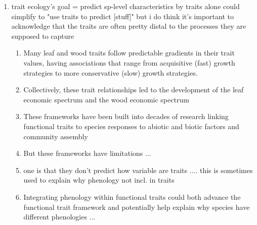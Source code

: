 \documentclass{article}
\begin{document}
\begin{enumerate}
\item trait ecology’s goal = predict sp-level characteristics by traits alone %
could simplify to "use traits to predict [stuff]" but i do think it's important to acknowledge that the traits are often pretty distal to the processes they are supposed to capture
\begin{enumerate}
\item Many leaf and wood traits follow predictable gradients in their trait values, having associations that range from acquisitive (fast) growth strategies to more conservative (slow) growth strategies.
\item Collectively, these trait relationships led to the development of the leaf economic spectrum and the wood economic spectrum
\item These frameworks have been built into decades of research linking functional traits to species responses to abiotic and biotic factors and community assembly
\item But these frameworks have limitations ... 
\item one is that they don't predict how variable are traits .... this is sometimes used to explain why phenology not incl. in traits %
\item Integrating phenology within functional traits could both advance the functional trait framework and potentially help explain why species have different phenologies ... %
\end{enumerate}


\end{enumerate}
\end{document}
